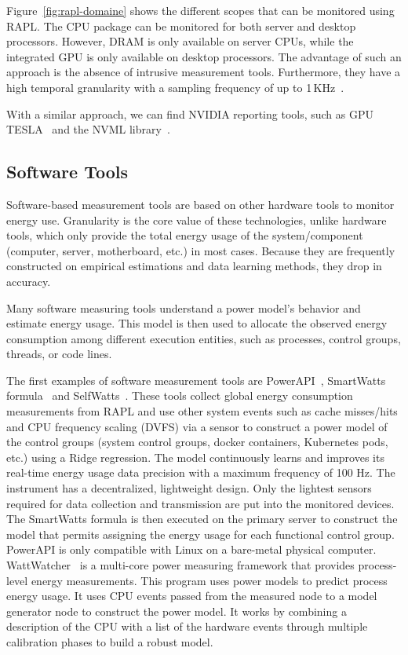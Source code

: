 Figure~\ref{fig:rapl-domaine} shows the different scopes that can be monitored using RAPL.
The CPU package can be monitored for both server and desktop processors. However, DRAM is only available on server CPUs, while the integrated GPU is only available on desktop processors.
The advantage of such an approach is the absence of intrusive measurement tools.
Furthermore, they have a high temporal granularity with a sampling frequency of up to 1\,KHz~\cite{ilsche_power_2015}.

With a similar approach, we can find NVIDIA reporting tools, such as GPU TESLA~\cite{burtscher2014measuring} and the NVML library~\cite{fahad2019comparative}.

\subsection{Software Tools}
Software-based measurement tools are based on other hardware tools to monitor energy use. Granularity is the core value of these technologies, unlike hardware tools, which only provide the total energy usage of the system/component (computer, server, motherboard, etc.) in most cases.
Because they are frequently constructed on empirical estimations and data learning methods, they drop in accuracy.

Many software measuring tools understand a power model's behavior and estimate energy usage.
This model is then used to allocate the observed energy consumption among different execution entities, such as processes, control groups, threads, or code lines.

The first examples of software measurement tools are PowerAPI~\cite{colmant2018next}, SmartWatts formula~\cite{fieni2020smartwatts} and SelfWatts~\cite{fieni2021selfwatts}.
These tools collect global energy consumption measurements from RAPL and use other system events such as cache misses/hits and CPU frequency scaling (DVFS) via a sensor to construct a power model of the control groups (system control groups, docker containers, Kubernetes pods, etc.) using a Ridge regression.
The model continuously learns and improves its real-time energy usage data precision with a maximum frequency of 100 Hz.
The instrument has a decentralized, lightweight design.
Only the lightest sensors required for data collection and transmission are put into the monitored devices.
The SmartWatts formula is then executed on the primary server to construct the model that permits assigning the energy usage for each functional control group.
PowerAPI is only compatible with Linux on a bare-metal physical computer.
\\
WattWatcher~\cite{lebeane2015watt} is a multi-core power measuring framework that provides process-level energy measurements.
This program uses power models to predict process energy usage. It uses CPU events passed from the measured node to a model generator node to construct the power model. It works by combining a description of the CPU with a list of the hardware events through multiple calibration phases to build a robust model.

